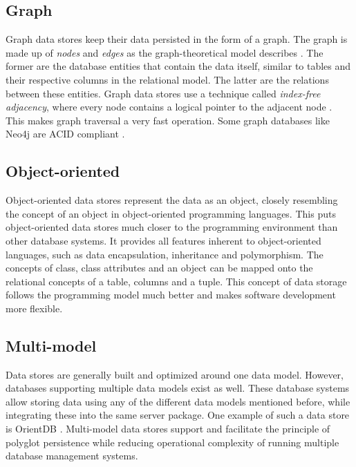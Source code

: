 \subsection{Graph}
\label{subsec:graph}

Graph data stores keep their data persisted in the form of a graph.
The graph is made up of \textit{nodes} and \textit{edges} as the graph-theoretical model describes \autocite{West2001}.
The former are the database entities that contain the data itself, similar to tables and their respective columns in the relational model.
The latter are the relations between these entities.
Graph data stores use a technique called \textit{index-free adjacency}, where every node contains a logical pointer to the adjacent node \autocite{Weinberger2016}.
This makes graph traversal a very fast operation.
Some graph databases like Neo4j are ACID compliant \autocite{Miller2013}.

\subsection{Object-oriented}
\label{subsec:object-oriented}

Object-oriented data stores represent the data as an object, closely resembling the concept of an object in object-oriented programming languages.
This puts object-oriented data stores much closer to the programming environment than other database systems.
It provides all features inherent to object-oriented languages, such as data encapsulation, inheritance and polymorphism.
The concepts of class, class attributes and an object can be mapped onto the relational concepts of a table, columns and a tuple.
This concept of data storage follows the programming model much better and makes software development more flexible.

\subsection{Multi-model}
\label{subsec:multi-model}

Data stores are generally built and optimized around one data model.
However, databases supporting multiple data models exist as well.
These database systems allow storing data using any of the different data models mentioned before, while integrating these into the same server package.
One example of such a data store is OrientDB \autocite{OrientDB2010}.
Multi-model data stores support and facilitate the principle of polyglot persistence while reducing operational complexity of running multiple database management systems.

